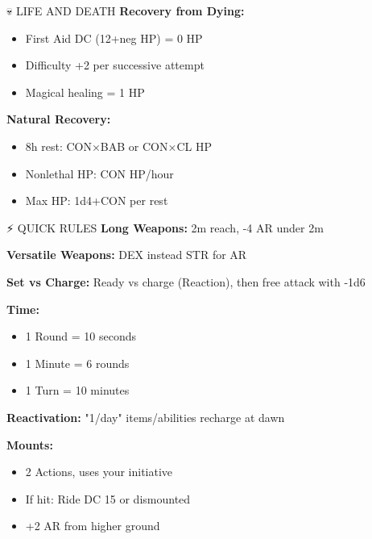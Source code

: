 \documentclass[10pt,a4paper,landscape]{article}
\begin{document}
\begin{multicols}{4}
\begin{mainsection}{💀 LIFE AND DEATH}
			\textbf{Recovery from Dying:}
			\begin{itemize}[noitemsep,leftmargin=8pt]
				\item First Aid DC (12+neg HP) = 0 HP
				\item Difficulty +2 per successive attempt
				\item Magical healing = 1 HP
			\end{itemize}

			\textbf{Natural Recovery:}
			\begin{itemize}[noitemsep,leftmargin=8pt]
				\item 8h rest: CON×BAB or CON×CL HP
				\item Nonlethal HP: CON HP/hour
				\item Max HP: 1d4+CON per rest
			\end{itemize}
		\end{mainsection}

		\begin{mainsection}{⚡ QUICK RULES}
			\textbf{Long Weapons:} 2m reach, -4 AR under 2m

			\textbf{Versatile Weapons:} DEX instead STR for AR

			\textbf{Set vs Charge:} Ready vs charge (Reaction), then free attack with -1d6

			\medskip

			\textbf{Time:}
			\begin{itemize}[noitemsep,leftmargin=8pt]
				\item 1 Round = 10 seconds
				\item 1 Minute = 6 rounds
				\item 1 Turn = 10 minutes
			\end{itemize}

			\textbf{Reactivation:} "1/day" items/abilities recharge at dawn

			\medskip

			\textbf{Mounts:}
			\begin{itemize}[noitemsep,leftmargin=8pt]
				\item 2 Actions, uses your initiative
				\item If hit: Ride DC 15 or dismounted
				\item +2 AR from higher ground
			\end{itemize}
		\end{mainsection}

	\end{multicols}
\end{document}
